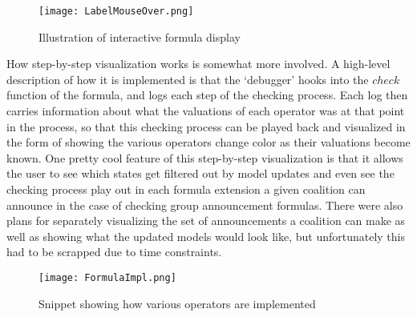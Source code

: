 \begin{figure}[H]
	\label{fig:labelHover}
	\caption{Illustration of interactive formula display}
	\texttt{[image: LabelMouseOver.png]}
\end{figure}

How step-by-step visualization works is somewhat more involved. A high-level description of how it is implemented is that the `debugger' hooks into the $check$ function of the formula, and logs each step of the checking process. Each log then carries information about what the valuations of each operator was at that point in the process, so that this checking process can be played back and visualized in the form of showing the various operators change color as their valuations become known. One pretty cool feature of this step-by-step visualization is that it allows the user to see which states get filtered out by model updates and even see the checking process play out in each formula extension a given coalition can announce in the case of checking group announcement formulas. There were also plans for separately visualizing the set of announcements a coalition can make as well as showing what the updated models would look like, but unfortunately this had to be scrapped due to time constraints.

\begin{figure}[H]
	\label{fig:formulaImpl}
	\caption{Snippet showing how various operators are implemented}
	\texttt{[image: FormulaImpl.png]}
\end{figure}




